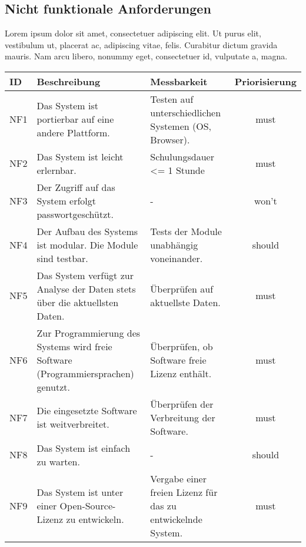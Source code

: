\subsection{Nicht funktionale Anforderungen}
Lorem ipsum dolor sit amet, consectetuer adipiscing elit. Ut purus elit, vestibulum ut, 
placerat ac, adipiscing vitae, felis. Curabitur dictum gravida mauris. Nam arcu libero, nonummy eget, consectetuer id, vulputate a, magna.
\begingroup
\setlength{\tabcolsep}{10pt} %
\renewcommand{\arraystretch}{1.25} 
\begin{table}[h]
    \centering
    \begin{adjustbox}{max width=\textwidth}
    \begin{tabular}{lp{6.5cm}p{6.5cm}c}
       \toprule
       \textbf{ID}          & \textbf{Beschreibung} & \textbf{Messbarkeit} & \textbf{Priorisierung}\\
       \midrule
        NF1                               &Das System ist portierbar auf eine andere Plattform. & Testen auf unterschiedlichen Systemen (OS, Browser). & must\\
        NF2                               &Das System ist leicht erlernbar.& Schulungsdauer <= 1 Stunde  & must\\
        NF3                               &Der Zugriff auf das System erfolgt passwortgeschützt. & -  & won't\\
        NF4                               &Der Aufbau des Systems ist modular. Die Module sind testbar. & Tests der Module unabhängig voneinander. & should\\
        NF5                               &Das System verfügt zur Analyse der Daten stets über die aktuellsten Daten. & Überprüfen auf aktuellste Daten. & must\\
        NF6                               &Zur Programmierung des Systems wird freie Software (Programmiersprachen) genutzt. & Überprüfen, ob Software freie Lizenz enthält.  & must\\
        NF7                               &Die eingesetzte Software ist weitverbreitet. & Überprüfen der Verbreitung der Software. & must\\
        NF8                               &Das System ist einfach zu warten. & - & should\\
        NF9                               &Das System ist unter einer Open-Source-Lizenz zu entwickeln. & Vergabe einer freien Lizenz für das zu entwickelnde System.  & must\\

\end{tabular}
\end{adjustbox}
\end{table}

